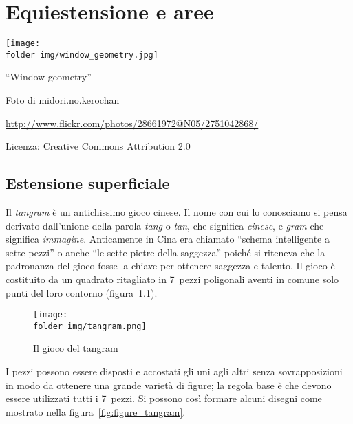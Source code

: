
\chapter{Equiestensione e aree}\label{chap:equiestensione_aree}

\texttt{[image: \\folder img/window\_geometry.jpg]}
  \begin{center}
    {\large ``Window geometry''}\par
    Foto di midori.no.kerochan\par
    \url{http://www.flickr.com/photos/28661972@N05/2751042868/}\par
    Licenza: Creative Commons Attribution 2.0\par
  \end{center}
\newpage


\section{Estensione superficiale}\label{sect:estensione_superficiale}

Il \emph{tangram}\label{tangram} è un antichissimo gioco cinese. Il 
nome con cui lo conosciamo si pensa derivato dall'unione della parola 
\emph{tang} o \emph{tan}, che significa \emph{cinese}, e \emph{gram} 
che significa \emph{immagine}. Anticamente in Cina era chiamato 
``schema intelligente a sette pezzi'' o anche ``le sette pietre della 
saggezza'' poiché si riteneva che la padronanza del gioco fosse la 
chiave per ottenere saggezza e talento.
Il gioco è costituito da un quadrato ritagliato in 7~pezzi poligonali 
aventi in comune solo punti del loro contorno 
(figura~\ref{fig:tangram}).


\begin{inaccessibleblock}
 \begin{figure}[!htb]
  \centering\texttt{[image: \\folder img/tangram.png]}
  \caption{Il gioco del tangram}\label{fig:tangram}
\end{figure}
\end{inaccessibleblock}

I pezzi possono essere disposti e accostati gli uni agli altri senza 
sovrapposizioni in modo da ottenere una grande varietà di figure; la 
regola base è che devono essere utilizzati tutti i 7~pezzi. Si 
possono così formare alcuni disegni come mostrato nella 
figura~\ref{fig:figure_tangram}.


